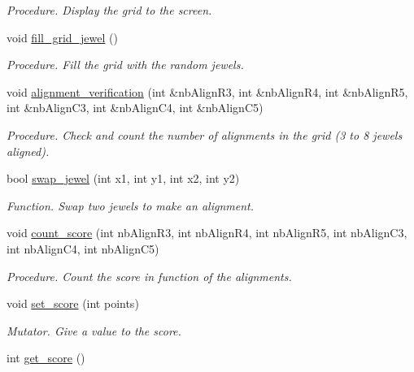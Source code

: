 \begin{DoxyCompactItemize}
\begin{DoxyCompactList}\small\item\em Procedure. Display the grid to the screen. \end{DoxyCompactList}\item 
void \hyperlink{classGrid_a33f8649c54b789906328f9aabd7f8081}{fill\+\_\+grid\+\_\+jewel} ()\hypertarget{classGrid_a33f8649c54b789906328f9aabd7f8081}{}\label{classGrid_a33f8649c54b789906328f9aabd7f8081}

\begin{DoxyCompactList}\small\item\em Procedure. Fill the grid with the random jewels. \end{DoxyCompactList}\item 
void \hyperlink{classGrid_adea72fa7e2e2f012932f02881e305494}{alignment\+\_\+verification} (int \&nb\+Align\+R3, int \&nb\+Align\+R4, int \&nb\+Align\+R5, int \&nb\+Align\+C3, int \&nb\+Align\+C4, int \&nb\+Align\+C5)
\begin{DoxyCompactList}\small\item\em Procedure. Check and count the number of alignments in the grid (3 to 8 jewels aligned). \end{DoxyCompactList}\item 
bool \hyperlink{classGrid_a745f847f89d5bff5a95b453a2b518351}{swap\+\_\+jewel} (int x1, int y1, int x2, int y2)
\begin{DoxyCompactList}\small\item\em Function. Swap two jewels to make an alignment. \end{DoxyCompactList}\item 
void \hyperlink{classGrid_a2f90f70fac7091c5ee3c8d3c78709611}{count\+\_\+score} (int nb\+Align\+R3, int nb\+Align\+R4, int nb\+Align\+R5, int nb\+Align\+C3, int nb\+Align\+C4, int nb\+Align\+C5)
\begin{DoxyCompactList}\small\item\em Procedure. Count the score in function of the alignments. \end{DoxyCompactList}\item 
void \hyperlink{classGrid_a431072be83d45cc180416ed78d5eee73}{set\+\_\+score} (int points)
\begin{DoxyCompactList}\small\item\em Mutator. Give a value to the score. \end{DoxyCompactList}\item 
int \hyperlink{classGrid_a02344c40c13b6a311b4bab0dfd66942f}{get\+\_\+score} ()

\end{DoxyCompactItemize}

